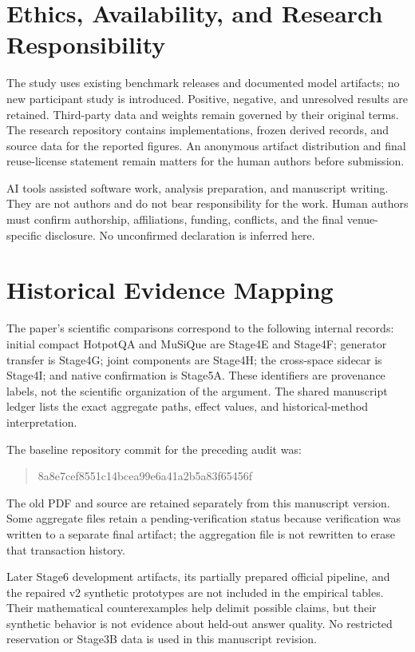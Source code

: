 \documentclass[11pt,a4paper]{article}
\begin{document}
\section*{Ethics, Availability, and Research Responsibility}
The study uses existing benchmark releases and documented model artifacts;
no new participant study is introduced. Positive, negative, and unresolved
results are retained. Third-party data and weights remain governed by their
original terms. The research repository contains implementations, frozen
derived records, and source data for the reported figures. An anonymous
artifact distribution and final reuse-license statement remain matters for
the human authors before submission.

AI tools assisted software work, analysis preparation, and manuscript
writing. They are not authors and do not bear responsibility for the work.
Human authors must confirm authorship, affiliations, funding, conflicts,
and the final venue-specific disclosure. No unconfirmed declaration is
inferred here.



\appendix
\section{Historical Evidence Mapping}
\label{app:scoring}
The paper's scientific comparisons correspond to the following internal
records: initial compact HotpotQA and MuSiQue are Stage4E and Stage4F;
generator transfer is Stage4G; joint components are Stage4H; the cross-space
sidecar is Stage4I; and native confirmation is Stage5A. These identifiers
are provenance labels, not the scientific organization of the argument.
The shared manuscript ledger lists the exact aggregate paths, effect
values, and historical-method interpretation.

\begin{samepage}
The baseline repository commit for the preceding audit was:
\begin{quote}\small\ttfamily
8a8e7cef8551c14bcea99e6a41a2b5a83f65456f
\end{quote}
\end{samepage}
The old PDF and source are retained separately from this manuscript version.
Some aggregate files retain a pending-verification status because verification
was written to a separate final artifact; the aggregation file is not
rewritten to erase that transaction history.

Later Stage6 development artifacts, its partially prepared official pipeline,
and the repaired v2 synthetic prototypes are not included in the empirical
tables. Their mathematical counterexamples help delimit possible claims,
but their synthetic behavior is not evidence about held-out answer quality.
No restricted reservation or Stage3B data is used in this manuscript revision.
\end{document}
